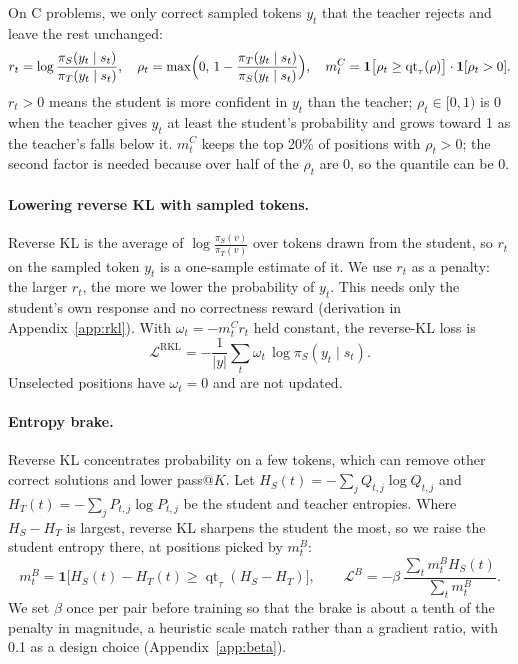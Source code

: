 \documentclass[10pt]{article}
\makeatletter
\newcommand{\passk}{pass@$K$}
\newcommand{\qt}{\operatorname{qt}}
\makeatother
\begin{document}
On C problems, we only correct sampled tokens $y_t$ that the teacher rejects
and leave the rest unchanged:
\begin{equation}
r_t=\log\frac{\pi_S(y_t\mid s_t)}{\pi_T(y_t\mid s_t)},\quad
\rho_t=\max\Bigl(0,\,1-\frac{\pi_T(y_t\mid s_t)}{\pi_S(y_t\mid s_t)}\Bigr),\quad
m^C_t=\mathbf 1\bigl[\rho_t\ge\qt_\tau(\rho)\bigr]\cdot\mathbf 1[\rho_t>0].
\label{eq:gate-c}
\end{equation}
$r_t>0$ means the student is more confident in $y_t$ than the teacher;
$\rho_t\in[0,1)$ is 0 when the teacher gives $y_t$ at least the student's
probability and grows toward 1 as the teacher's falls below it.
$m^C_t$ keeps the top 20\% of positions with $\rho_t>0$; the second factor is
needed because over half of the $\rho_t$ are 0, so the quantile can be 0.

\paragraph{Lowering reverse KL with sampled tokens.} Reverse KL is the average
of $\log\frac{\pi_S(v)}{\pi_T(v)}$ over tokens drawn from the student, so $r_t$
on the sampled token $y_t$ is a one-sample estimate of it. We use $r_t$ as a
penalty: the larger $r_t$, the more we lower the probability of $y_t$. This
needs only the student's own response and no correctness reward
\citep{gu2024minillm} (derivation in Appendix~\ref{app:rkl}). With
$\omega_t=-m^C_t r_t$ held constant, the reverse-KL loss is
\begin{equation}
\mathcal L^{\mathrm{RKL}}=-\frac{1}{|y|}\textstyle\sum_{t}\omega_t\,\log\pi_S(y_t\mid s_t).
\label{eq:loss-c}
\end{equation}
Unselected positions have $\omega_t=0$ and are not updated.

\paragraph{Entropy brake.} Reverse KL concentrates probability on a few tokens,
which can remove other correct solutions and lower \passk{}. Let $H_S(t)=-\sum_jQ_{t,j}\log Q_{t,j}$ and
$H_T(t)=-\sum_jP_{t,j}\log P_{t,j}$ be the student and teacher entropies. Where
$H_S-H_T$ is largest, reverse KL sharpens the student the most, so we raise the
student entropy there, at positions picked by $m^B_t$:
\begin{equation}
m^B_t=\mathbf 1\bigl[H_S(t)-H_T(t)\ge\qt_\tau(H_S-H_T)\bigr],\qquad
\mathcal L^B=-\beta\,\frac{\sum_t m^B_t H_S(t)}{\sum_t m^B_t}.
\label{eq:brake}
\end{equation}
We set $\beta$ once per pair before training so that the brake is about a
tenth of the penalty in magnitude, a heuristic scale match rather than a
gradient ratio, with 0.1 as a design choice (Appendix~\ref{app:beta}).
\end{document}
